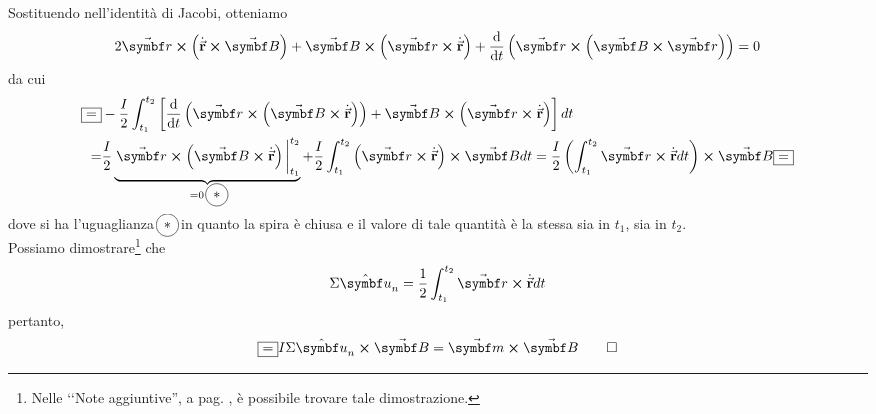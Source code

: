 \begin{demonstration}
	Sostituendo nell'identità di Jacobi, otteniamo
	\begin{equation*}
		2\vba{r}\cross\left(\vbd{r}\cross\vba{B}\right)+\vba{B}\cross\left(\vba{r}\cross\vbd{r}\right)+\dv{t}\left(\vba{r}\cross\left(\vba{B}\cross\vba{r}\right)\right)=0
	\end{equation*}
	da cui
	\begin{align*}
		\squarequal& -\frac{I}{2}\int_{t_1}^{t_2}\left[\dv{t}\left(\vba{r}\cross\left(\vba{B}\cross\vbd{r}\right)\right)+\vba{B}\cross\left(\vba{r}\cross\vbd{r}\right)\right]dt\\
		=&\frac{I}{2}\underbrace{\eval{\vba{r}\cross\left(\vba{B}\cross\vbd{r}\right)}_{t_1}^{t_2}}_{=0\ \circled{\ast}}+\frac{I}{2}\int_{t_1}^{t_2}\left(\vba{r}\cross\vbd{r}\right)\cross\vba{B}dt=\frac{I}{2}\left(\int_{t_1}^{t_2}\vba{r}\cross\vbd{r}dt\right)\cross\vba{B}\squarequal
	\end{align*}
	dove si ha l'uguaglianza $\circled{\ast}$ in quanto la spira è chiusa e il valore di tale quantità è la stessa sia in $t_1$, sia in  $t_2$.\\
	Possiamo dimostrare\footnote{Nelle ‘‘Note aggiuntive'', a pag. \pageref{AreaCurvaDelimitata}, è possibile trovare tale dimostrazione.} che
	\begin{equation*}
		\Sigma\vbh{u}_n=\frac{1}{2}\int_{t_1}^{t_2}\vba{r}\cross\vbd{r}dt
	\end{equation*}
pertanto,
\begin{equation*}
	\squarequal I\Sigma\vbh{u}_n\cross \vba{B}=\vba{m}\cross\vba{B}\qedhere
\end{equation*}
\end{demonstration}
